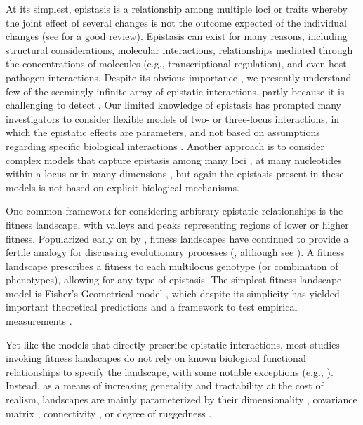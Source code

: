 \documentclass[dvips,12pt,twoside,titlepage]{article}
\begin{document}
At its simplest, epistasis is a relationship among multiple loci or traits whereby the joint effect of several changes is not the outcome expected of the individual changes (see  for a good review).
Epistasis can exist for many reasons, including structural considerations, molecular interactions, relationships mediated through the concentrations of molecules (e.g., transcriptional regulation), and even host-pathogen interactions. 
Despite its obvious importance \cite{Wolf:2000vt}, we presently understand few of the seemingly infinite array of epistatic interactions, partly because it is challenging to detect \cite{Whitlock:1995vj}.
Our limited knowledge of epistasis has prompted many investigators to consider flexible models of two- or three-locus interactions, in which the epistatic effects are parameters, and not based on assumptions regarding specific biological interactions \cite{Cheverud:1996wj,Wolf:2000vt,Takahasi:2005et,Gandon:2007ip}. 
Another approach is to consider complex models that capture epistasis among many loci \cite{Gavrilets:1998dm,Weinreich:2005vg,Yukilevich:2008p593}, at many nucleotides within a locus \cite{Kauffman:1987p595,Orr:2006p805} or in many dimensions \cite{Martin:2006p1459}, but again the epistasis present in these models is not based on explicit biological mechanisms. 

One common framework for considering arbitrary epistatic relationships is the fitness landscape, with valleys and peaks representing regions of lower or higher fitness. 
Popularized early on by , fitness landscapes have continued to provide a fertile analogy for discussing evolutionary processes (, although see ). 
A fitness landscape prescribes a fitness to each multilocus genotype (or combination of phenotypes), allowing for any type of epistasis. 
The simplest fitness landscape model is Fisher's Geometrical model \cite{Fisher:1930qy}, which despite its simplicity has yielded important theoretical predictions \cite{Orr:2005p1460,Martin:2006p1459} and a framework to test empirical measurements \cite{Martin:2007p1457}. 

Yet like the models that directly prescribe epistatic interactions, most studies invoking fitness landscapes do not rely on known biological functional relationships to specify the landscape, with some notable exceptions (e.g., ).
Instead, as a means of increasing generality and tractability at the cost of realism, landscapes are mainly parameterized by their dimensionality \cite{Orr:2000p3190}, covariance matrix \cite{Martin:2006p1459}, connectivity \cite{Yukilevich:2008p593,Macia:2012fx}, or degree of ruggedness \cite{Orr:2006p805}.
\end{document}
